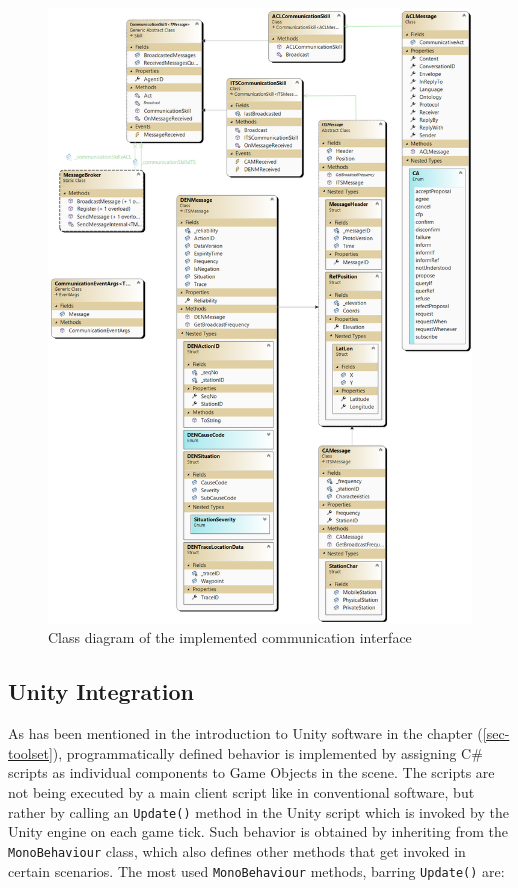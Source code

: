 \documentclass[main.tex]{subfiles}
\begin{document}
\begin{figure}[htbp]
    \centering
    \includegraphics[width=.99\textwidth]{mas-its-communication.png}
    \caption{Class diagram of the implemented communication interface}
    \label{fig-classes-comm}
\end{figure}

\subsection{Unity Integration}

As has been mentioned in the introduction to Unity software in the chapter (\ref{sec-toolset}), programmatically 
defined behavior is implemented by assigning C\# scripts as individual components to Game Objects in 
the scene. The scripts are not being executed by a main client script like in conventional software, but 
rather by calling an \texttt{Update()} method in the Unity script which is invoked by the Unity engine 
on each game tick. Such behavior is obtained by inheriting from the \texttt{MonoBehaviour} class, which 
also defines other methods that get invoked in certain scenarios. The most used \texttt{MonoBehaviour} 
methods, barring \texttt{Update()} are:
\end{document}
